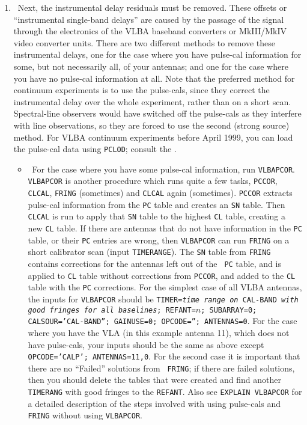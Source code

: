 \begin{enumerate}
\item\ {Next, the instrumental delay residuals must be removed.  These
offsets or ``instrumental single-band delays'' are caused by the
passage of the signal through the electronics of the VLBA baseband
converters or MkIII/MkIV video converter units.  There are two
different methods to remove these instrumental delays, one for the
case where you have pulse-cal information for some, but not
necessarily all, of your antennas; and one for the case where you have
no pulse-cal information at all.  Note that the preferred method for
continuum experiments is to use the pulse-cals, since they correct the
instrumental delay over the whole experiment, rather than on a short
scan.
Spectral-line observers would have switched off the pulse-cals as they
interfere with line observations, so they are forced to use the second
(strong source) method.  For VLBA continuum experiments before April
1999, you can load the pulse-cal data using {\tt PCLOD}; consult the
\@.}
\begin{itemize}
\item\ {For the case where you have some pulse-cal information, run
{\tt VLBAPCOR}\@.  {\tt VLBAPCOR} is another procedure which runs
quite a few tasks, {\tt PCCOR}, {\tt CLCAL}, {\tt FRING} (sometimes)
and {\tt CLCAL} again (sometimes).  {\tt PCCOR} extracts pulse-cal
information from the {\tt PC} table and creates an {\tt SN} table.
Then {\tt CLCAL} is run to apply that {\tt SN} table to the highest
{\tt CL} table, creating a new {\tt CL} table.  If there are antennas
that do not have information in the {\tt PC} table, or their {\tt PC}
entries are wrong, then {\tt VLBAPCOR} can run {\tt FRING} on a short
calibrator scan (input {\tt TIMERANGE})\@.  The {\tt SN} table from
{\tt FRING} contains corrections for the antennas left out of the {\tt
PC} table, and is applied to {\tt CL} table without corrections from
{\tt PCCOR}, and added to the {\tt CL} table with the {\tt PC}
corrections.  For the simplest case of all VLBA antennas, the inputs
for {\tt VLBAPCOR} should be {\tt TIMER={\it time range on} CAL-BAND
{\it with good fringes for all baselines}; REFANT=$n$; SUBARRAY=0;
CALSOUR='CAL-BAND''; GAINUSE=0; OPCODE=''; ANTENNAS=0}\@.  For the
case where you have the VLA (in this example antenna 11), which does
not have pulse-cals, your inputs should be the same as above except
{\tt OPCODE='CALP'; ANTENNAS=11,0}\@.  For the second case it is
important that there are no ``Failed'' solutions from {\tt
FRING}; if there are failed solutions, then you should delete the
tables that were created and find another {\tt TIMERANG} with good
fringes to the {\tt REFANT}.  Also see {\tt EXPLAIN VLBAPCOR} for a
detailed description of the steps involved with using pulse-cals
and {\tt FRING} without using {\tt VLBAPCOR}\@.}


\end{itemize}
\end{enumerate}
